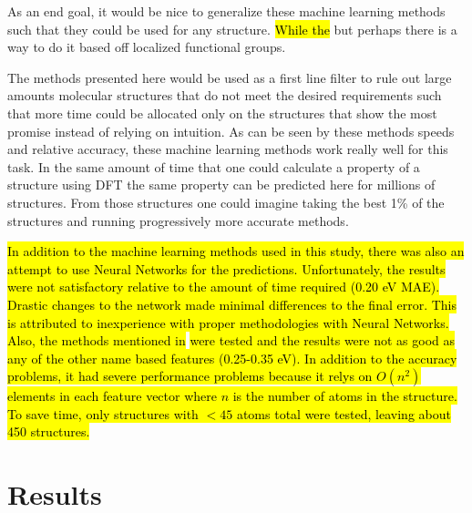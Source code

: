 \documentclass[10pt]{article}
\begin{document}
As an end goal, it would be nice to generalize these machine learning methods such that they could be used for any structure. \hl{While the} but perhaps there is a way to do it based off localized functional groups.

The methods presented here would be used as a first line filter to rule out large amounts molecular structures that do not meet the desired requirements such that more time could be allocated only on the structures that show the most promise instead of relying on intuition. As can be seen by these methods speeds and relative accuracy, these machine learning methods work really well for this task. In the same amount of time that one could calculate a property of a structure using DFT the same property can be predicted here for millions of structures. From those structures one could imagine taking the best 1\% of the structures and running progressively more accurate methods.

\hl{In addition to the machine learning methods used in this study, there was also an attempt to use Neural Networks for the predictions. Unfortunately, the results were not satisfactory relative to the amount of time required (0.20 eV MAE). Drastic changes to the network made minimal differences to the final error. This is attributed to inexperience with proper methodologies with Neural Networks.}
\hl{Also, the methods mentioned in }\cite{hansen_assessment_2013} \hl{were tested and the results were not as good as any of the other name based features (0.25-0.35 eV). In addition to the accuracy problems, it had severe performance problems because it relys on $O(n^2)$ elements in each feature vector where $n$ is the number of atoms in the structure. To save time, only structures with $<45$ atoms total were tested, leaving about 450 structures.}

\nocite{ruddigkeit_enumeration_2012}
\nocite{darley_beyond_2008}
\nocite{frisch_gaussian_2009}
\nocite{montavon_machine_2013}
\nocite{handley_dynamically_2009}
\nocite{hansen_assessment_2013}
\nocite{schutt_how_2013}
\nocite{reymond_exploring_2012}
\nocite{whitfield_computational_2013}
\nocite{hansen_assessment_2013-1}
\nocite{ra_dft_2008}
\nocite{martell_assessment_1997}
\nocite{montavon_learning_2012}
\nocite{domingos_few_2012}
\nocite{martin_benchmark_1997}
\nocite{handley_potential_2010}
\nocite{rupp_fast_2012}


\newpage
\appendix

\section{Results}
\end{document}
